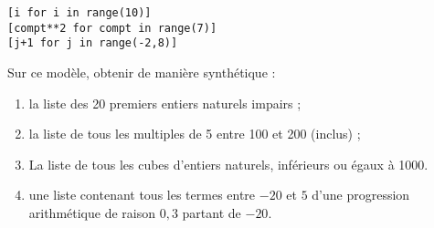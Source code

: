 \begin{lstlisting}
[i for i in range(10)]
[compt**2 for compt in range(7)]
[j+1 for j in range(-2,8)]
\end{lstlisting}
Sur ce modèle, obtenir de manière synthétique : 
\begin{enumerate}[label=\emph{\alph*)}]
  \item la liste des 20 premiers entiers naturels impairs ;
  \item la liste de tous les multiples de 5 entre 100 et 200 (inclus) ;
  \item La liste de tous les cubes d'entiers naturels, inférieurs ou égaux à 1000. 
  \item une liste contenant tous les termes entre $-20$ et $5$ d'une progression arithmétique de raison $0,3$ partant de $-20$.
\end{enumerate}



